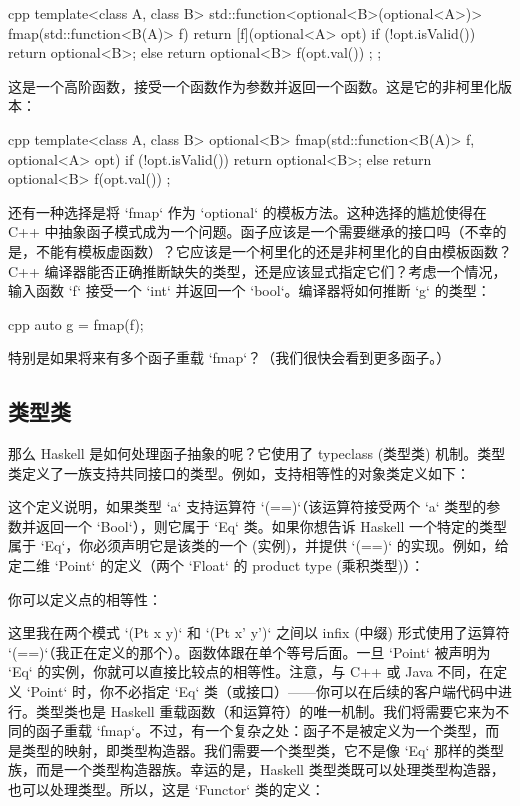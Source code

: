 \begin{snip}{cpp}
template<class A, class B>
std::function<optional<B>(optional<A>)>
fmap(std::function<B(A)> f) {
    return [f](optional<A> opt) {
        if (!opt.isValid())
            return optional<B>{};
        else
            return optional<B>{ f(opt.val()) };
    };
}
\end{snip}
这是一个高阶函数，接受一个函数作为参数并返回一个函数。这是它的非柯里化版本：

\begin{snip}{cpp}
template<class A, class B>
optional<B> fmap(std::function<B(A)> f, optional<A> opt) {
    if (!opt.isValid())
        return optional<B>{};
    else
        return optional<B>{ f(opt.val()) };
}
\end{snip}
还有一种选择是将 `fmap` 作为 `optional` 的模板方法。这种选择的尴尬使得在 C++ 中抽象函子模式成为一个问题。函子应该是一个需要继承的接口吗（不幸的是，不能有模板虚函数）？它应该是一个柯里化的还是非柯里化的自由模板函数？C++ 编译器能否正确推断缺失的类型，还是应该显式指定它们？考虑一个情况，输入函数 `f` 接受一个 `int` 并返回一个 `bool`。编译器将如何推断 `g` 的类型：

\begin{snip}{cpp}
auto g = fmap(f);
\end{snip}
特别是如果将来有多个函子重载 `fmap`？（我们很快会看到更多函子。）

\subsection{类型类}

那么 Haskell 是如何处理函子抽象的呢？它使用了 typeclass (类型类) 机制。类型类定义了一族支持共同接口的类型。例如，支持相等性的对象类定义如下：

这个定义说明，如果类型 `a` 支持运算符 `(==)`（该运算符接受两个 `a` 类型的参数并返回一个 `Bool`），则它属于 `Eq` 类。如果你想告诉 Haskell 一个特定的类型属于 `Eq`，你必须声明它是该类的一个  (实例)，并提供 `(==)` 的实现。例如，给定二维 `Point` 的定义（两个 `Float` 的 product type (乘积类型)）：

你可以定义点的相等性：

这里我在两个模式 `(Pt x y)` 和 `(Pt x' y')` 之间以 infix (中缀) 形式使用了运算符 `(==)`（我正在定义的那个）。函数体跟在单个等号后面。一旦 `Point` 被声明为 `Eq` 的实例，你就可以直接比较点的相等性。注意，与 C++ 或 Java 不同，在定义 `Point` 时，你不必指定 `Eq` 类（或接口）——你可以在后续的客户端代码中进行。类型类也是 Haskell 重载函数（和运算符）的唯一机制。我们将需要它来为不同的函子重载 `fmap`。不过，有一个复杂之处：函子不是被定义为一个类型，而是类型的映射，即类型构造器。我们需要一个类型类，它不是像 `Eq` 那样的类型族，而是一个类型构造器族。幸运的是，Haskell 类型类既可以处理类型构造器，也可以处理类型。所以，这是 `Functor` 类的定义：

